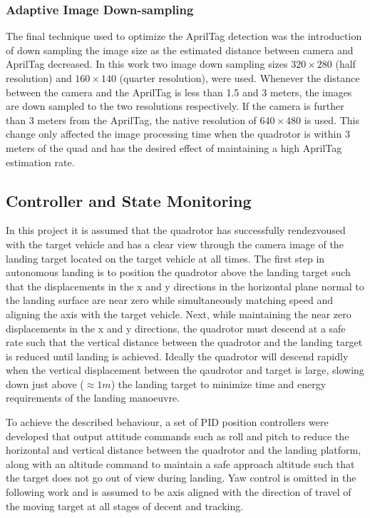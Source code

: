 \documentclass[11pt, twocolumn]{article}
\begin{document}
\subsubsection{Adaptive Image Down-sampling}
The final technique used to optimize the AprilTag detection was the introduction of down sampling the image size as the estimated distance between camera and AprilTag decreased. In this work two image down sampling sizes $320 \times 280$ (half resolution) and $160 \times 140$ (quarter resolution), were used. Whenever the distance between the camera and the AprilTag is less than 1.5 and 3 meters, the images are down sampled to the two resolutions respectively. If the camera is further than 3 meters from the AprilTag, the native resolution of $640 \times 480$ is used. This change only affected the image processing time when the quadrotor is within 3 meters of the quad and has the desired effect of maintaining a high AprilTag estimation rate.


\subsection{Controller and State Monitoring}
\label{subsec:position_controller}
In this project it is assumed that the quadrotor has successfully rendezvoused with the target vehicle and has a clear view through the camera image of the landing target located on the target vehicle at all times. The first step in autonomous landing is to position the quadrotor above the landing target such that the displacements in the x and y directions in the horizontal plane normal to the landing surface are near zero while simultaneously matching speed and aligning the axis with the target vehicle. Next, while maintaining the near zero displacements in the x and y directions, the quadrotor must descend at a safe rate such that the vertical distance between the quadrotor and the landing target is reduced until landing is achieved. Ideally the quadrotor will descend rapidly when the vertical displacement between the qaudrotor and target is large, slowing down just above ($\approx 1m$) the landing target to minimize time and energy requirements of the landing manoeuvre. 

To achieve the described behaviour, a set of PID position controllers were developed that output attitude commands such as roll and pitch to reduce the horizontal and vertical distance between the quadrotor and the landing platform, along with an altitude command to maintain a safe approach altitude such that the target does not go out of view during landing. Yaw control is omitted in the following work and is assumed to be axis aligned with the direction of travel of the moving target at all stages of decent and tracking. 
\end{document}
